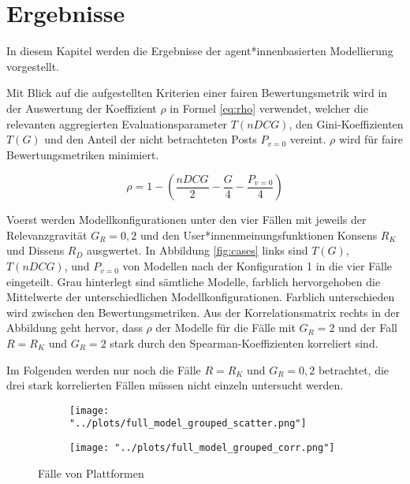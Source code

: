 \chapter{Ergebnisse}

In diesem Kapitel werden die Ergebnisse der agent*innenbasierten Modellierung vorgestellt.

Mit Blick auf die aufgestellten Kriterien einer fairen Bewertungsmetrik wird in der Auswertung der Koeffizient $\rho$ in Formel \ref{eq:rho} verwendet, welcher die relevanten aggregierten Evaluationsparameter $T(nDCG)$, den Gini-Koeffizienten $T(G)$ und den Anteil der nicht betrachteten Posts $P_{v=0}$ vereint. $\rho$ wird für faire Bewertungsmetriken minimiert.

\begin{equation}
\rho =  1 - (\frac{nDCG}{2} - \frac{G}{4} - \frac{P_{v=0}}{4})
\end{equation}

Voerst werden Modellkonfigurationen unter den vier Fällen mit jeweils der Relevanzgravität $G_R = {0,2} $ und den User*innenmeinungsfunktionen Konsens $R_K$ und Dissens $R_D$ ausgwertet. In Abbildung \ref{fig:cases} links sind $T(G)$, $T(nDCG)$, und $P_{v = 0}$ von Modellen nach der Konfiguration 1 in die vier Fälle eingeteilt. Grau  hinterlegt sind sämtliche Modelle, farblich hervorgehoben die Mittelwerte der unterschiedlichen Modellkonfigurationen. Farblich unterschieden wird zwischen den Bewertungsmetriken. Aus der Korrelationsmatrix rechts in der Abbildung geht hervor, dass $\rho$ der Modelle für die Fälle mit $G_R = 2$ und der Fall $R = R_K$ und $G_R = 2$ stark durch den Spearman-Koeffizienten korreliert sind. 

Im Folgenden werden nur noch die Fälle $R = R_K$ und $G_R = {0,2}$ betrachtet, die drei stark korrelierten Fällen müssen nicht einzeln untersucht werden.


\begin{figure}[!h]
	\label{fig:cases}	
	\begin{subfigure}{0.5\textwidth}
		\texttt{[image: "../plots/full\_model\_grouped\_scatter.png"]}
	\end{subfigure}
	\begin{subfigure}{0.5\textwidth}
		\texttt{[image: "../plots/full\_model\_grouped\_corr.png"]}
	\end{subfigure}
	\caption{Fälle von Plattformen}
\end{figure}



